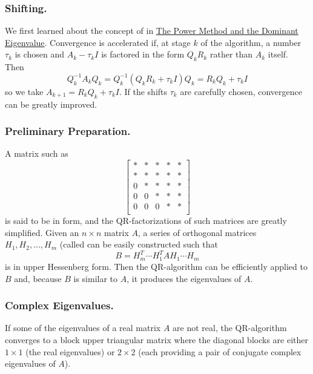 \documentclass{ximera}
\begin{document}
\subsubsection*{Shifting.} We first learned about the concept of  in \href{}{The Power Method and the Dominant Eigenvalue}.  Convergence is accelerated if, at stage $k$ of the algorithm, a number $\tau_{k}$ is chosen and $A_{k} - \tau_{k}I$ is factored in the form $Q_{k}R_{k}$ rather than $A_{k}$ itself. Then
\begin{equation*}
Q_{k}^{-1}A_{k}Q_{k} = Q_{k}^{-1}(Q_{k}R_{k} + \tau_{k}I)Q_{k} = R_{k}Q_{k} + \tau_{k}I
\end{equation*}
so we take $A_{k+1} = R_{k}Q_{k} + \tau_{k}I$. If the shifts $\tau_{k}$ are carefully chosen, convergence can be greatly improved.

\subsubsection*{Preliminary Preparation.} A matrix such as
\begin{equation*}
\left[ \begin{array}{rrrrr}
\ast  & \ast & \ast & \ast & \ast  \\
\ast  & \ast & \ast & \ast & \ast  \\
0  & \ast & \ast & \ast & \ast  \\
0  & 0 & \ast & \ast & \ast  \\
0  & 0 & 0 & \ast & \ast  \\
\end{array}\right]
\end{equation*}
is said to be in  form, and the QR-factorizations of such matrices are greatly simplified. Given an $n \times n$ matrix $A$, a series of orthogonal matrices $H_{1}, H_{2}, \dots, H_{m}$ (called  can be easily constructed such that
\begin{equation*}
B = H_{m}^T \cdots H_{1}^TAH_{1} \cdots H_{m}
\end{equation*}
is in upper Hessenberg form. Then the QR-algorithm can be efficiently applied to $B$ and, because $B$ is similar to $A$, it produces the eigenvalues of $A$.

\subsubsection*{Complex Eigenvalues.} If some of the eigenvalues of a real matrix $A$ are not real, the QR-algorithm converges to a block upper triangular matrix where the diagonal blocks are either $1 \times 1$ (the real eigenvalues) or $2 \times 2$ (each providing a pair of conjugate complex eigenvalues of $A$).
\end{document}
